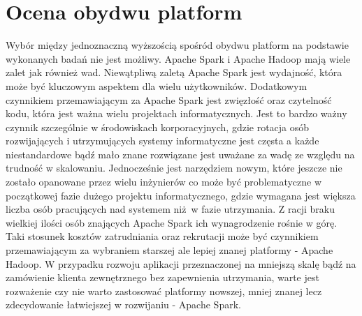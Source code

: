 \section{Ocena obydwu platform}
Wybór między jednoznaczną wyższością spośród obydwu platform na podstawie wykonanych badań nie jest możliwy. Apache Spark i Apache Hadoop mają wiele zalet jak również wad. Niewątpliwą zaletą Apache Spark jest wydajność, która może być kluczowym aspektem dla wielu użytkowników. Dodatkowym czynnikiem przemawiającym za Apache Spark jest zwięzłość oraz czytelność kodu, która jest ważna wielu projektach informatycznych. Jest to bardzo ważny czynnik szczególnie w środowiskach korporacyjnych, gdzie rotacja osób rozwijających i utrzymujących systemy informatyczne jest częsta a każde niestandardowe bądź mało znane rozwiązane jest uważane za wadę ze względu na trudność w skalowaniu. Jednocześnie jest narzędziem nowym, które jeszcze nie zostało opanowane przez wielu inżynierów co może być problematyczne w początkowej fazie dużego projektu informatycznego, gdzie wymagana jest większa liczba osób pracujących nad systemem niż w fazie utrzymania. Z racji braku wielkiej ilości osób znających Apache Spark ich wynagrodzenie rośnie w górę. Taki stosunek kosztów zatrudniania oraz rekrutacji może być czynnikiem przemawiającym za wybraniem starszej ale lepiej znanej platformy - Apache Hadoop. W przypadku rozwoju aplikacji przeznaczonej na mniejszą skalę bądź na zamówienie klienta zewnętrznego bez zapewnienia utrzymania, warte jest rozważenie czy nie warto zastosować platformy nowszej, mniej znanej lecz zdecydowanie łatwiejszej w rozwijaniu - Apache Spark.
